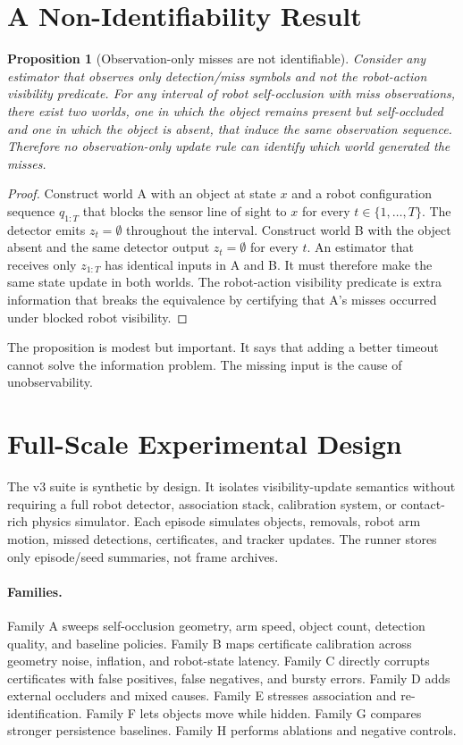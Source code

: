 \documentclass{article}
\newtheorem{proposition}{Proposition}
\begin{document}
\section{A Non-Identifiability Result}

\begin{proposition}[Observation-only misses are not identifiable]
Consider any estimator that observes only detection/miss symbols and not the
robot-action visibility predicate. For any interval of robot self-occlusion with
miss observations, there exist two worlds, one in which the object remains
present but self-occluded and one in which the object is absent, that induce the
same observation sequence. Therefore no observation-only update rule can
identify which world generated the misses.
\end{proposition}

\begin{proof}
Construct world A with an object at state $x$ and a robot configuration sequence
$q_{1:T}$ that blocks the sensor line of sight to $x$ for every
$t\in\{1,\ldots,T\}$. The detector emits $z_t=\emptyset$ throughout the interval.
Construct world B with the object absent and the same detector output
$z_t=\emptyset$ for every $t$. An estimator that receives only $z_{1:T}$ has
identical inputs in A and B. It must therefore make the same state update in
both worlds. The robot-action visibility predicate is extra information that
breaks the equivalence by certifying that A's misses occurred under blocked
robot visibility.
\end{proof}

The proposition is modest but important. It says that adding a better timeout
cannot solve the information problem. The missing input is the cause of
unobservability.

\section{Full-Scale Experimental Design}

The v3 suite is synthetic by design. It isolates visibility-update semantics
without requiring a full robot detector, association stack, calibration system,
or contact-rich physics simulator. Each episode simulates objects, removals,
robot arm motion, missed detections, certificates, and tracker updates. The
runner stores only episode/seed summaries, not frame archives.

\paragraph{Families.}
Family A sweeps self-occlusion geometry, arm speed, object count, detection
quality, and baseline policies. Family B maps certificate calibration across
geometry noise, inflation, and robot-state latency. Family C directly corrupts
certificates with false positives, false negatives, and bursty errors. Family D
adds external occluders and mixed causes. Family E stresses association and
re-identification. Family F lets objects move while hidden. Family G compares
stronger persistence baselines. Family H performs ablations and negative
controls.
\end{document}
